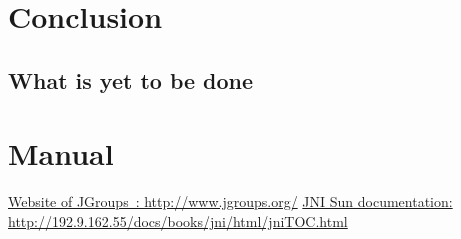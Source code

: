 \documentclass[a4paper,10pt]{report}
\begin{document}
\chapter{Conclusion}

\section{}

\section{What is yet to be done}

\chapter{Manual}


\listoffigures

\begin{thebibliography}{99}
   \href{http://www.jgroups.org/}{Website of JGroups~: http://www.jgroups.org/}
   \href{http://192.9.162.55/docs/books/jni/html/jniTOC.html}{JNI Sun documentation: http://192.9.162.55/docs/books/jni/html/jniTOC.html}
\end{thebibliography}
\end{document}
